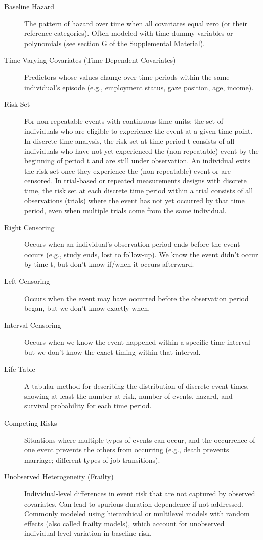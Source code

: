 \documentclass[
  english,
  man, donotrepeattitle,floatsintext]{apa6}
\begin{document}
\begin{description}
\item[Baseline Hazard] The pattern of hazard over time when all covariates equal zero (or their reference categories). Often modeled with time dummy variables or polynomials (see section G of the Supplemental Material).

\item[Time-Varying Covariates (Time-Dependent Covariates)] Predictors whose values change over time periods within the same individual's episode (e.g., employment status, gaze position, age, income).

\item[Risk Set] For non-repeatable events with continuous time units: the set of individuals who are eligible to experience the event at a given time point. In discrete-time analysis, the risk set at time period t consists of all individuals who have not yet experienced the (non-repeatable) event by the beginning of period t and are still under observation. An individual exits the risk set once they experience the (non-repeatable) event or are censored. In trial-based or repeated measurements designs with discrete time, the risk set at each discrete time period within a trial consists of all observations (trials) where the event has not yet occurred by that time period, even when multiple trials come from the same individual.

\item[Right Censoring] Occurs when an individual's observation period ends before the event occurs (e.g., study ends, lost to follow-up). We know the event didn't occur by time t, but don't know if/when it occurs afterward.

\item[Left Censoring] Occurs when the event may have occurred before the observation period began, but we don't know exactly when.

\item[Interval Censoring] Occurs when we know the event happened within a specific time interval but we don't know the exact timing within that interval.

\item[Life Table] A tabular method for describing the distribution of discrete event times, showing at least the number at risk, number of events, hazard, and survival probability for each time period.

\item[Competing Risks] Situations where multiple types of events can occur, and the occurrence of one event prevents the others from occurring (e.g., death prevents marriage; different types of job transitions).

\item[Unobserved Heterogeneity (Frailty)] Individual-level differences in event risk that are not captured by observed covariates. Can lead to spurious duration dependence if not addressed. Commonly modeled using hierarchical or multilevel models with random effects (also called frailty models), which account for unobserved individual-level variation in baseline risk.

\end{description}
\end{document}
